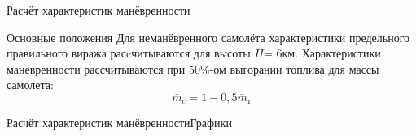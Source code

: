 \begin{frame}{Расчёт характеристик манёвренности}
    \begin{block}{Основные положения}
        Для неманёвренного самолёта характеристики предельного правильного виража расcчитываются для высоты $H$= 6км.
        Характеристики маневренности рассчитываются при 50\%-ом выгорании топлива для массы самолета:
        $$\bar{m}_c = 1- 0,5\bar{m}_\text{т}$$
    \end{block}
\end{frame}

\begin{frame}{Расчёт характеристик манёвренности}{Графики}
    \begin{minipage}[c]{0.45\textwidth}
    \end{minipage}  
    \begin{minipage}[c]{0.45\textwidth}
    \end{minipage}
\end{frame}